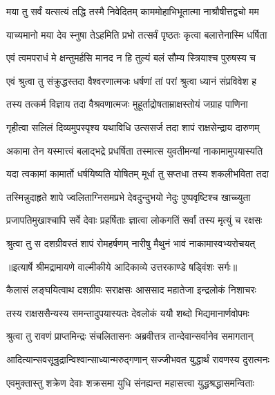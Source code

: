 \twolineshloka
{मया तु सर्वं यत्सत्यं तद्धि तस्मै निवेदितम्}
{काममोहाभिभूतात्मा नाश्रौषीत्तद्वचो मम} %

\twolineshloka
{याच्यमानो मया देव स्नुषा तेऽहमिति प्रभो}
{तत्सर्वं पृष्ठतः कृत्वा बलात्तेनास्मि धर्षिता} %

\twolineshloka
{एवं त्वमपराधं मे क्षन्तुमर्हसि मानद}
{न हि तुल्यं बलं सौम्य स्त्रियाश्च पुरुषस्य च} %

\twolineshloka
{एवं श्रुत्वा तु संक्रुद्धस्तदा वैश्वरणात्मजः}
{धर्षणां तां परां श्रुत्वा ध्यानं संप्रविवेश ह} %

\twolineshloka
{तस्य तत्कर्म विज्ञाय तदा वैश्रवणात्मजः}
{मुहूर्ताद्रोषताम्राक्षस्तोयं जग्राह पाणिना} %

\twolineshloka
{गृहीत्वा सलिलं दिव्यमुपस्पृश्य यथाविधि}
{उत्ससर्ज तदा शापं राक्षसेन्द्राय दारुणम्} %

\twolineshloka
{अकामा तेन यस्मात्त्वं बलाद्भद्रे प्रधर्षिता}
{तस्मात्स युवतीमन्यां नाकामामुपयास्यति} %

\twolineshloka
{यदा त्वकामां कामार्तो धर्षयिष्यति योषितम्}
{मूर्धा तु सप्तधा तस्य शकलीभविता तदा} %

\twolineshloka
{तस्मिन्नुदाहृते शापे ज्वलिताग्निसमप्रभे}
{देवदुन्दुभयो नेदुः पुष्पवृष्टिश्च खाच्च्युता} %

\twolineshloka
{प्रजापतिमुखाश्चापि सर्वे देवाः प्रहर्षिताः}
{ज्ञात्वा लोकगतिं सर्वां तस्य मृत्युं च रक्षसः} %

\twolineshloka
{श्रुत्वा तु स दशग्रीवस्तं शापं रोमहर्षणम्}
{नारीषु मैथुनं भावं नाकामास्वभ्यरोचयत्} %


{॥इत्यार्षे श्रीमद्रामायणे वाल्मीकीये आदिकाव्ये उत्तरकाण्डे षड्विंशः सर्गः॥}


\twolineshloka
{कैलासं लङ्घयित्वाथ दशग्रीवः सराक्षसः}
{आससाद महातेजा इन्द्रलोकं निशाचरः} %

\twolineshloka
{तस्य राक्षससैन्यस्य समन्तादुपयास्यतः}
{देवलोकं ययौ शब्दो भिद्यमानार्णवोपमः} %

\twolineshloka
{श्रुत्वा तु रावणं प्राप्तमिन्द्रः संचलितासनः}
{अब्रवीत्तत्र तान्देवान्सर्वानेव समागतान्} %

\twolineshloka
{आदित्यान्सवसून्रुद्रान्विश्वान्साध्यान्मरुद्गणान्}
{सज्जीभवत युद्धार्थं रावणस्य दुरात्मनः} %

\twolineshloka
{एवमुक्तास्तु शक्रेण देवाः शक्रसमा युधि}
{संनह्यन्त महासत्त्वा युद्धश्रद्धासमन्विताः} %

